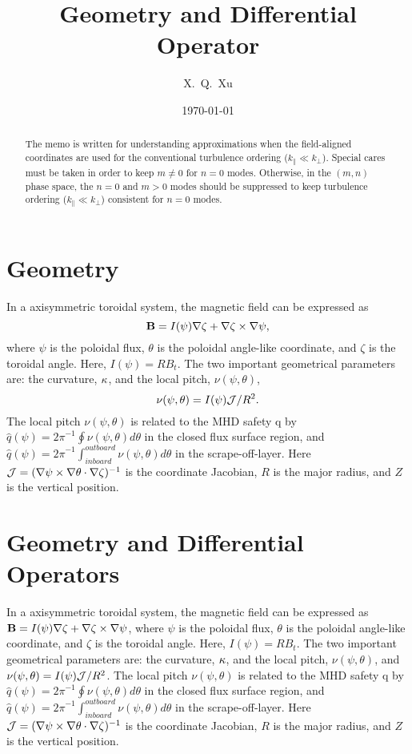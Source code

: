 \documentclass [11pt]{article}
\begin{document}
\title{\bf Geometry and Differential Operator }
\author{X.~Q.~Xu}
 \date{\today}
\maketitle

\begin{abstract}
The memo is written for understanding approximations 
when the field-aligned coordinates are used for the 
conventional turbulence ordering ($k_\|\ll k_\perp$).
Special cares must be taken in order to keep
$m\ne0$ for $n=0$ modes. Otherwise, in the $(m,n)$ phase space, 
the $n=0$ and $m>0$ modes should be suppressed to 
keep turbulence ordering ($k_\|\ll k_\perp$) consistent for $n=0$ modes.
\end{abstract}

\section{Geometry}

In a axisymmetric toroidal system, the magnetic field can be expressed as
$${\bf B}=I(\psi)\nabla\zeta+\nabla\zeta\times\nabla\psi,$$
where $\psi$ is the poloidal flux, 
$\theta$ is the poloidal angle-like coordinate, and $\zeta$ is the toroidal angle. Here, $I(\psi)=RB_t$.
The two important geometrical parameters are: the curvature, $\bf \kappa$, and 
the local pitch, $\nu(\psi,\theta)$,
$$\nu(\psi,\theta)= {I(\psi){\bf \cal J}/R^2}.$$
The local pitch $\nu(\psi,\theta)$ is related to the MHD safety q 
by $\hat q(\psi)={2\pi}^{-1}\oint\nu(\psi,\theta) d\theta$ in the closed flux surface region, and  
$\hat q(\psi)={2\pi}^{-1}\int_{inboard}^{outboard}\nu(\psi,\theta) d\theta$ in the scrape-off-layer. 
Here ${\bf \cal J}=(\nabla\psi\times\nabla\theta\cdot\nabla\zeta)^{-1}$
is the coordinate Jacobian, 
$R$ is the major radius, and $Z$ is the vertical position.

\section{Geometry and Differential Operators}

In a axisymmetric toroidal system, the magnetic field can be expressed as
${\bf B}=I(\psi)\nabla\zeta+\nabla\zeta\times\nabla\psi$, where $\psi$ is the poloidal flux, 
$\theta$ is the poloidal angle-like coordinate, and $\zeta$ is the toroidal angle. Here, $I(\psi)=RB_t$.
The two important geometrical parameters 
are: the curvature, $\bf \kappa$, and 
the local pitch, $\nu(\psi,\theta)$, and $\nu(\psi,\theta)= {I(\psi){\bf \cal J}/R^2}$. 
The local pitch $\nu(\psi,\theta)$ is related to the MHD safety q 
by $\hat q(\psi)={2\pi}^{-1}\oint\nu(\psi,\theta) d\theta$ in the closed flux surface region, and  
$\hat q(\psi)={2\pi}^{-1}\int_{inboard}^{outboard}\nu(\psi,\theta) d\theta$ in the scrape-off-layer. 
Here ${\bf \cal J}=(\nabla\psi\times\nabla\theta\cdot\nabla\zeta)^{-1}$
is the coordinate Jacobian, 
$R$ is the major radius, and $Z$ is the vertical position.
\end{document}
